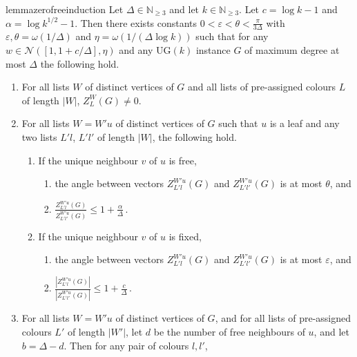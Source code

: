 \documentclass[10pt,a4paper]{article}
\theoremstyle{definition}
\newcommand*{\eps}{\varepsilon}
\newcommand*{\UG}[1][]{UG$(#1)$}
\newenvironment{itemeq}{\hspace*{\fill}$\displaystyle}{$\hspace*{\fill}}
\begin{document}
\begin{restatable}{lemma}{zerofreeinduction}
\label{lem:kcol}
Let $\Delta\in \mathbb{N}_{\geq 3}$ and let $k\in \mathbb{N}_{\geq 3}$.  
Let $c=\log k-1$ and $\alpha=\log k^{1/2}-1$.
Then there exists constants $0<\eps<\theta<\frac{\pi}{3\Delta}$ with $\eps,\theta=\omega(1/\Delta)$ and $\eta=\omega(1/(\Delta\log k))$ such that for any $w\in \mathcal{N}([1,1+c/\Delta],\eta)$ and any \UG[k] instance $G$ of maximum degree at most $\Delta$
the following hold.
\begin{enumerate}
 \item\label{itm:kcol,nonzero}
 For all lists $W$ of distinct vertices of $G$ and all lists of pre-assigned colours $L$ of length $|W|$, $Z_L^W(G) \ne 0$.
 \item\label{itm:kcol,leaf}
 For all lists $W=W'u$ of distinct vertices of $G$ such that $u$ is a leaf and any two lists $L'l$, $L'l'$ of length $|W|$, the following hold.
 \begin{enumerate}
 \item\label{itm:kcol,leaf,free}
 If the unique neighbour $v$ of $u$ is free,
 \begin{enumerate}
 \item\label{itm:kcol,leaf,free,angle}
  the angle between vectors $Z_{L'l}^{W'u}(G)$ and $Z_{L'l'}^{W'u}(G)$ is at most $\theta$, and
 \item\label{itm:kcol,leaf,free,length}
       \begin{itemeq}
          \frac{Z_{L'l}^{W'u}(G)}{Z_{L'l'}^{W'u}(G)}   \leq 1 + \frac{\alpha}{\Delta}\,.
       \end{itemeq}
 \end{enumerate}
 \item\label{itm:kcol,leaf,fixed}
 If the unique neighbour $v$ of $u$ is fixed,
 \begin{enumerate}
 \item\label{itm:kcol,leaf,fixed,angle}
 the angle between vectors $Z_{L'l}^{W'u}(G)$ and $Z_{L'l'}^{W'u}(G)$ is at most $\eps$, and
 \item\label{itm:kcol,leaf,fixed,length} 
       \begin{itemeq}
          \frac{|Z_{L'l}^{W'u}(G)|}{|Z_{L'l'}^{W'u}(G)|}   \leq 1 + \frac{c}{\Delta}\,.
       \end{itemeq}
 \end{enumerate}
 \end{enumerate}
 \item\label{itm:kcol,nonleaf}
 For all lists $W = W'u$ of distinct vertices of $G$, and for all lists of pre-assigned colours $L'$ of length $|W'|$, let $d$ be the number of free neighbours of $u$, and let $b=\Delta-d$. Then for any pair of colours $l,l'$,

\end{enumerate}
\end{restatable}
\end{document}
